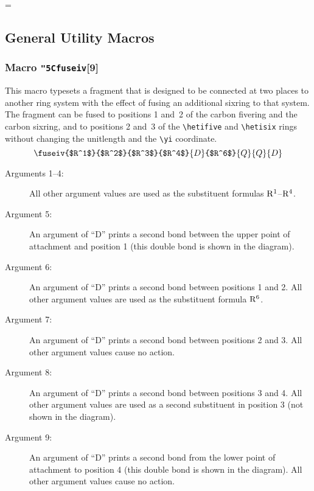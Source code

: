 % 
% 
% 
% 
  =\tenrm
  \initial
 
\subsection{General Utility Macros}
\subsubsection{Macro {\tt\char"5C{}fuseiv}[9]}
  This macro typesets a fragment that is designed to be
 connected at two places to another ring system with the
 effect of fusing an additional sixring to that system.
 The fragment can be fused to positions 1 and~2 of the
 carbon fivering and the carbon sixring, and to positions
 2 and~3 of the \verb+\hetifive+ and \verb+\hetisix+ rings
 without changing
 the unitlength and the \verb+\yi+ coordinate.
   
 \[ \fuseiv{$R^1$}{$R^2$}{$R^3$}{$R^4$}{D}{$R^6$}{Q}{Q}{D} \]
 
 \reinit
 \begin{description}
 \item[{\rm Arguments 1--4:}]  \rhq  All other argument
 values are used as the substituent formulas ${\rm R^1}$--${\rm R^4}$.
 \item[{\rm Argument 5:}]  An argument of ``D''
      prints a second bond between the upper point of
      attachment and position 1 (this double bond is shown
      in the diagram). \rii
 \item[{\rm Argument 6:}] \rhq  An argument of ``D'' prints
      a second bond between positions 1 and 2. All other argument
      values are used as the substituent formula ${\rm R^6}$.
 \item[{\rm Argument 7:}]  An argument of ``D''
      prints a second bond between positions 2 and 3. All other
      argument values cause no action.
 \item[{\rm Argument 8:}] \rhq  An argument of ``D'' prints
      a second bond between positions 3 and 4.  All other
      argument values are used as a second substituent in
      position 3 (not shown in the diagram).
 \item[{\rm Argument 9:}] An argument of ``D'' prints
      a second bond from the lower point of attachment to
      position 4 (this double bond is shown in the diagram).
      All other argument values cause no action.
 \end{description}
 
